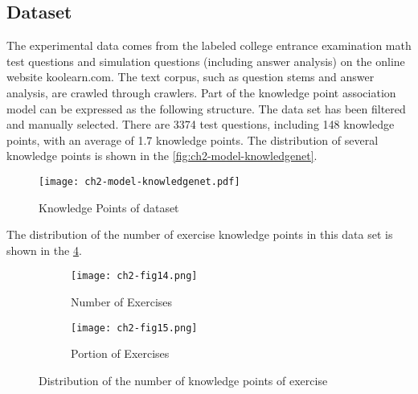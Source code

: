 \subsection{Dataset}
The experimental data comes from the labeled college entrance examination math test questions and simulation questions (including answer analysis) on the online website koolearn.com. The text corpus, such as question stems and answer analysis, are crawled through crawlers. Part of the knowledge point association model can be expressed as the following structure. The data set has been filtered and manually selected. There are 3374 test questions, including 148 knowledge points, with an average of 1.7 knowledge points. The distribution of several knowledge points is shown in the \figurename{\ref{fig:ch2-model-knowledgenet}}.
\begin{figure}[H]
	\centering
	\texttt{[image: ch2-model-knowledgenet.pdf]}
	\caption{Knowledge Points of dataset}\label{fig:ch2-model-knowledgenet.pdf}
\end{figure}

The distribution of the number of exercise knowledge points in this data set is shown in the \figurename{\ref{ch2-fig14}}.
\begin{figure}[H]
	\centering
	\begin{subfigure}[b]{0.475\textwidth}
		\texttt{[image: ch2-fig14.png]}
		\caption[dis]{Number of Exercises}\label{fig:ch2-fig14-hist}
	\end{subfigure}
	\begin{subfigure}[b]{0.475\textwidth}
		\texttt{[image: ch2-fig15.png]}
		\caption{Portion of Exercises}\label{fig:ch2-fig14-pie}
	\end{subfigure}
	\caption{Distribution of the number of knowledge points of exercise}\label{ch2-fig14}
\end{figure}


